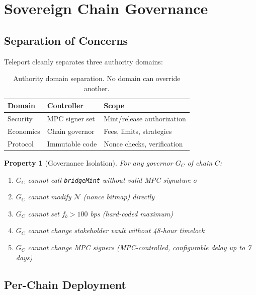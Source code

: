 \documentclass[11pt]{article}
\newtheorem{property}{Property}
\begin{document}
\section{Sovereign Chain Governance}
\label{sec:governance}

\subsection{Separation of Concerns}

Teleport cleanly separates three authority domains:

\begin{table}[h]
\centering
\small
\begin{tabular}{lll}
\toprule
\textbf{Domain} & \textbf{Controller} & \textbf{Scope} \\
\midrule
Security & MPC signer set & Mint/release authorization \\
Economics & Chain governor & Fees, limits, strategies \\
Protocol & Immutable code & Nonce checks, verification \\
\bottomrule
\end{tabular}
\caption{Authority domain separation. No domain can override another.}
\label{tab:separation}
\end{table}

\begin{property}[Governance Isolation]
\label{prop:isolation}
For any governor $G_C$ of chain $C$:
\begin{enumerate}[nosep]
  \item $G_C$ cannot call \texttt{bridgeMint} without valid MPC signature $\sigma$
  \item $G_C$ cannot modify $\mathcal{N}$ (nonce bitmap) directly
  \item $G_C$ cannot set $f_b > 100$ bps (hard-coded maximum)
  \item $G_C$ cannot change stakeholder vault without 48-hour timelock
  \item $G_C$ cannot change MPC signers (MPC-controlled, configurable delay up to 7 days)
\end{enumerate}
\end{property}

\subsection{Per-Chain Deployment}
\end{document}
